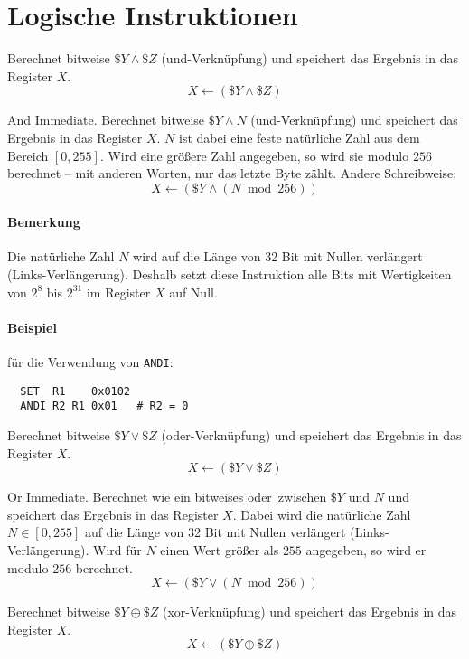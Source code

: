 \section{Logische Instruktionen}

Berechnet bitweise $\$Y \land \$Z$ (und-Verknüpfung) und speichert das Ergebnis
in das Register $X$.
\[
    X \gets (\$Y \land \$Z)
\]


\glqq And Immediate\grqq. Berechnet bitweise $\$Y \land N$ (und-Verknüpfung) und
speichert das Ergebnis in das Register $X$. $N$ ist dabei eine feste natürliche
Zahl aus dem Bereich $[0, 255]$. Wird eine größere Zahl angegeben, so wird sie
modulo $256$ berechnet -- mit anderen Worten, nur das letzte Byte zählt.
Andere Schreibweise:
\[
    X \gets (\$Y \land (N \bmod 256))
\]
\paragraph{Bemerkung}
Die natürliche Zahl $N$ wird auf die Länge von 32 Bit mit Nullen verlängert
(Links-Verlängerung).
Deshalb setzt diese Instruktion alle Bits mit Wertigkeiten von $2^{8}$ bis
$2^{31}$ im Register $X$ auf Null.

\paragraph{Beispiel}
für die Verwendung von \texttt{ANDI}:
\begin{lstlisting}
  SET  R1    0x0102
  ANDI R2 R1 0x01   # R2 = 0
\end{lstlisting}



Berechnet bitweise $\$Y \lor \$Z$ (oder-Verknüpfung) und speichert das Ergebnis
in das Register $X$.
\[
    X \gets (\$Y \lor \$Z)
\]


\glqq Or Immediate\grqq.
Berechnet wie  ein bitweises \glqq oder\grqq\ zwischen $\$Y$ und $N$
und speichert das Ergebnis in das Register $X$. Dabei wird die natürliche Zahl
$N \in [0, 255]$ auf die Länge von 32 Bit mit Nullen verlängert
(Links-Verlängerung). Wird für $N$ einen Wert größer als $255$ angegeben, so
wird er modulo $256$ berechnet.
\[
    X \gets (\$Y \lor (N \bmod 256))
\]


Berechnet bitweise $\$Y \oplus \$Z$ (xor-Verknüpfung) und speichert das Ergebnis
in das Register $X$.
\[
    X \gets (\$Y \oplus \$Z)
\]


